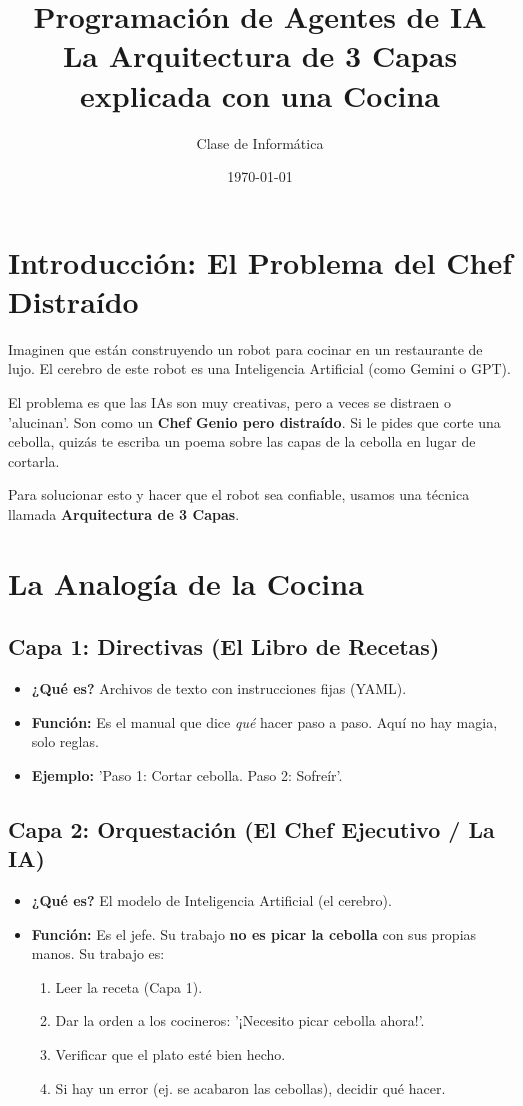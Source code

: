 \documentclass[12pt, a4paper]{article}
\title{\textbf{Programación de Agentes de IA}\\ \large La Arquitectura de 3 Capas explicada con una Cocina}
\author{Clase de Informática}
\date{\today}
\begin{document}
\maketitle

\section{Introducción: El Problema del Chef Distraído}

Imaginen que están construyendo un robot para cocinar en un restaurante de lujo. El cerebro de este robot es una Inteligencia Artificial (como Gemini o GPT).

El problema es que las IAs son muy creativas, pero a veces se distraen o 'alucinan'. Son como un \textbf{Chef Genio pero distraído}. Si le pides que corte una cebolla, quizás te escriba un poema sobre las capas de la cebolla en lugar de cortarla.

Para solucionar esto y hacer que el robot sea confiable, usamos una técnica llamada \textbf{Arquitectura de 3 Capas}.

\section{La Analogía de la Cocina}

\subsection{Capa 1: Directivas (El Libro de Recetas)}
\begin{itemize}
    \item \textbf{¿Qué es?} Archivos de texto con instrucciones fijas (YAML).
    \item \textbf{Función:} Es el manual que dice \textit{qué} hacer paso a paso. Aquí no hay magia, solo reglas.
    \item \textbf{Ejemplo:} 'Paso 1: Cortar cebolla. Paso 2: Sofreír'.
\end{itemize}

\subsection{Capa 2: Orquestación (El Chef Ejecutivo / La IA)}
\begin{itemize}
    \item \textbf{¿Qué es?} El modelo de Inteligencia Artificial (el cerebro).
    \item \textbf{Función:} Es el jefe. Su trabajo \textbf{no es picar la cebolla} con sus propias manos. Su trabajo es:
    \begin{enumerate}
        \item Leer la receta (Capa 1).
        \item Dar la orden a los cocineros: '¡Necesito picar cebolla ahora!'.
        \item Verificar que el plato esté bien hecho.
        \item Si hay un error (ej. se acabaron las cebollas), decidir qué hacer.
    \end{enumerate}
\end{itemize}
\end{document}
